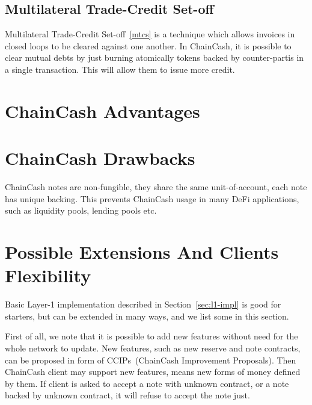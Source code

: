 \documentclass{article}   %
\newcommand{\cc}{ChainCash}
\begin{document}
\subsection{Multilateral Trade-Credit Set-off}

Multilateral Trade-Credit Set-off~\ref{mtcs} is a technique which allows invoices in closed loops to be cleared against one another.
In \cc{}, it is possible to clear mutual debts by just burning atomically tokens backed by counter-partis in a single
transaction. This will allow them to issue more credit.

\section{\cc{} Advantages}

\section{\cc{} Drawbacks}

ChainCash notes are non-fungible, they share the same unit-of-account, each note has unique backing. This prevents ChainCash usage
in many DeFi applications, such as liquidity pools, lending pools etc.


\section{Possible Extensions And Clients Flexibility}

Basic Layer-1 implementation described in Section~\ref{sec:l1-impl} is good for starters, but can be extended in many ways,
and we list some in this section.

First of all, we note that it is possible to add new features without need for the whole network to update. New features,
such as new reserve and note contracts, can be proposed in form of CCIPs~(ChainCash Improvement Proposals). Then ChainCash
client may support new features, means new forms of money defined by them. If client is asked to accept a note with unknown
contract, or a note backed by unknown contract, it will refuse to accept the note just.


\newpage

 
\end{document}
